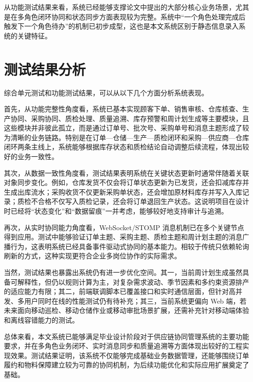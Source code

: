 从功能测试结果来看，系统已经能够支撑论文中提出的大部分核心业务场景，尤其是在多角色闭环协同和状态同步方面表现较为完整。系统中“一个角色处理完成后触发下一个角色待办”的机制已初步成型，这也是本文系统区别于静态信息录入系统的关键特征。

\section{测试结果分析}

综合单元测试和功能测试结果，可以从以下几个方面分析系统表现。

首先，从功能完整性角度看，系统已基本实现顾客下单、销售审核、仓库核查、生产协同、采购协同、质检处理、质量追溯、库存预警和周计划生成等主要模块，且这些模块并非彼此孤立，而是通过订单号、批次号、采购单号和消息主题形成了较为清晰的业务链路。特别是在订单—仓储—生产—质检闭环和采购—供应商—仓库闭环两条主线上，系统能够根据库存状态和质检结论自动调整后续流程，体现出较好的业务一致性。

其次，从数据一致性角度看，测试结果表明系统在关键状态更新时通常伴随着关联对象同步变化。例如，仓库发货不仅会将订单状态更新为已发货，还会扣减库存并生成出库流水；采购收货不仅更新采购单状态，还会增加原材料库存并写入入库记录；质检不合格不仅写入质检记录，还会将订单退回生产状态。这说明项目在设计时已经将“状态变化”和“数据留痕”一并考虑，能够较好地支持审计与追溯。

再次，从实时协同能力角度看，WebSocket/STOMP 消息机制已在多个关键节点得到应用。测试中能够验证订单主题、采购主题、质检主题和周计划主题的消息广播行为，这表明系统已经具备事件驱动式协同的基本能力。相较于传统只依赖轮询刷新的方式，这种实现更符合企业多岗位协作的实际需求。

当然，测试结果也暴露出系统仍有进一步优化空间。其一，当前周计划生成虽然具备可解释性，但仍以规则计算为主，对复杂需求波动、季节因素和多约束资源排产的适应能力有限；其二，前端联调脚本已覆盖接口和实时通信层面，但针对高并发、多用户同时在线的性能测试仍有待补充；其三，当前系统更偏向 Web 端，若未来面向移动巡检、移动仓储作业或移动审批场景扩展，还需补充针对移动端体验和离线容错能力的测试。

总体来看，本文系统已能够满足毕业设计阶段对于供应链协同管理系统的主要功能要求，并在多角色业务闭环、实时消息同步和质量追溯等方面体现出较好的工程实现效果。测试结果证明，该系统不仅能够完成基础业务数据管理，还能够围绕订单履约和物料保障建立较为可靠的协同机制，为后续功能优化和实际应用扩展奠定了基础。

